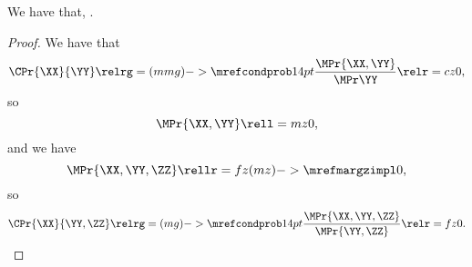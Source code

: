 \begin{proposition}
  We have that, \pzerocindprop.%
\end{proposition}

\begin{proof}
  We have that 
  $$\CPr{\XX}{\YY} \relrg = (mmg)->{\mrefcondprob} 14pt \frac{\MPr{\XX, \YY}}{\MPr\YY} \relr = cz 0,$$
  so 
  $$\MPr{\XX, \YY} \rell = mz 0,$$
  and we have
  $$\MPr{\XX, \YY, \ZZ} \rellr = fz (mz)->{\mrefmargzimpl} 0,$$
  so
  $$\CPr{\XX}{\YY, \ZZ} \relrg = (mg)->{\mrefcondprob} 14pt \frac{\MPr{\XX, \YY, \ZZ}}{\MPr{\YY,\ZZ}} \relr = fz 0.$$
\end{proof}
